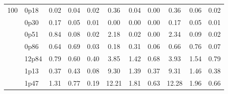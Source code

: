 \documentclass[12pt,A4paper]{article}
\begin{document}
\begin{table}[]
\begin{tabular}{lllllllllll}
\multicolumn{1}{|l|}{\multirow{13}{*}{100}} & \multicolumn{1}{l|}{0p18} & \multicolumn{1}{c|}{0.02}        & \multicolumn{1}{c|}{0.04}         & \multicolumn{1}{c|}{0.02}        & \multicolumn{1}{c|}{0.36}         & \multicolumn{1}{c|}{0.04}        & \multicolumn{1}{c|}{0.00}         & \multicolumn{1}{c|}{0.36}         & \multicolumn{1}{c|}{0.06}         & \multicolumn{1}{c|}{0.02}         \\ \cline{2-11} 
\multicolumn{1}{|l|}{} & \multicolumn{1}{l|}{0p30} & \multicolumn{1}{c|}{0.17}        & \multicolumn{1}{c|}{0.05}         & \multicolumn{1}{c|}{0.01}        & \multicolumn{1}{c|}{0.00}         & \multicolumn{1}{c|}{0.00}        & \multicolumn{1}{c|}{0.00}        & \multicolumn{1}{c|}{0.17}        & \multicolumn{1}{c|}{0.05}        & \multicolumn{1}{c|}{0.01}         \\ \cline{2-11}
\multicolumn{1}{|l|}{} & \multicolumn{1}{l|}{0p51} & \multicolumn{1}{c|}{0.84}        & \multicolumn{1}{c|}{0.08}         & \multicolumn{1}{c|}{0.02}        & \multicolumn{1}{c|}{2.18}         & \multicolumn{1}{c|}{0.02}        & \multicolumn{1}{c|}{0.00}        & \multicolumn{1}{c|}{2.34}        & \multicolumn{1}{c|}{0.09}        & \multicolumn{1}{c|}{0.02}         \\ \cline{2-11}
\multicolumn{1}{|l|}{} & \multicolumn{1}{l|}{0p86} & \multicolumn{1}{c|}{0.64}        & \multicolumn{1}{c|}{0.69}         & \multicolumn{1}{c|}{0.03}        & \multicolumn{1}{c|}{0.18}         & \multicolumn{1}{c|}{0.31}        & \multicolumn{1}{c|}{0.06}        & \multicolumn{1}{c|}{0.66}        & \multicolumn{1}{c|}{0.76}        & \multicolumn{1}{c|}{0.07}         \\ \cline{2-11}
\multicolumn{1}{|l|}{} & \multicolumn{1}{l|}{12p84} & \multicolumn{1}{c|}{0.79}        & \multicolumn{1}{c|}{0.60}         & \multicolumn{1}{c|}{0.40}        & \multicolumn{1}{c|}{3.85}         & \multicolumn{1}{c|}{1.42}        & \multicolumn{1}{c|}{0.68}        & \multicolumn{1}{c|}{3.93}        & \multicolumn{1}{c|}{1.54}        & \multicolumn{1}{c|}{0.79}         \\ \cline{2-11}
\multicolumn{1}{|l|}{} & \multicolumn{1}{l|}{1p13} & \multicolumn{1}{c|}{0.37}        & \multicolumn{1}{c|}{0.43}         & \multicolumn{1}{c|}{0.08}        & \multicolumn{1}{c|}{9.30}         & \multicolumn{1}{c|}{1.39}        & \multicolumn{1}{c|}{0.37}        & \multicolumn{1}{c|}{9.31}        & \multicolumn{1}{c|}{1.46}        & \multicolumn{1}{c|}{0.38}         \\ \cline{2-11}
\multicolumn{1}{|l|}{} & \multicolumn{1}{l|}{1p47} & \multicolumn{1}{c|}{1.31}        & \multicolumn{1}{c|}{0.77}         & \multicolumn{1}{c|}{0.19}        & \multicolumn{1}{c|}{12.21}         & \multicolumn{1}{c|}{1.81}        & \multicolumn{1}{c|}{0.63}        & \multicolumn{1}{c|}{12.28}        & \multicolumn{1}{c|}{1.96}        & \multicolumn{1}{c|}{0.66}         \\ \cline{2-11}

\end{tabular}
\end{table}
\end{document}
